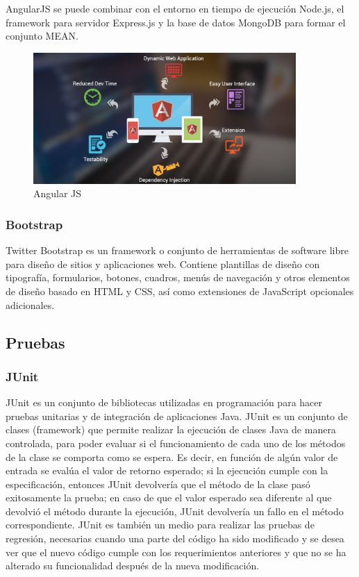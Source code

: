 \documentclass[12pt, a4paper, twoside]{book}
\begin{document}
	AngularJS se puede combinar con el entorno en tiempo de ejecución Node.js, el framework para servidor Express.js y la base de datos MongoDB para formar el conjunto MEAN.\\
	\begin{center}
		\begin{figure}[H]
			\centering
			\includegraphics[width=10cm]{Imagenes/angularjs.jpg}
			\caption{Angular JS}\label{angularjs}
		\end{figure}
	\end{center}
	\subsubsection{Bootstrap}    
	Twitter Bootstrap es un framework o conjunto de herramientas de software
	libre para diseño de sitios y aplicaciones web. Contiene plantillas de diseño con
	tipografía, formularios, botones, cuadros, menús de navegación y otros elementos
	de diseño basado en HTML y CSS, así como extensiones de JavaScript opcionales
	adicionales.  
	\subsection{Pruebas}
	\subsubsection{JUnit}
	JUnit es un conjunto de bibliotecas utilizadas en programación para hacer
	pruebas unitarias y de integración de aplicaciones Java.
	JUnit es un conjunto de clases (framework) que permite realizar la ejecución
	de clases Java de manera controlada, para poder evaluar si el funcionamiento de
	cada uno de los métodos de la clase se comporta como se espera. Es decir, en
	función de algún valor de entrada se evalúa el valor de retorno esperado; si la
	ejecución cumple con la especificación, entonces JUnit devolvería que el método
	de la clase pasó exitosamente la prueba; en caso de que el valor esperado sea
	diferente al que devolvió el método durante la ejecución, JUnit devolvería un fallo
	en el método correspondiente.
	JUnit es también un medio para realizar las pruebas de regresión, necesarias
	cuando una parte del código ha sido modificado y se desea ver que el nuevo código
	cumple con los requerimientos anteriores y que no se ha alterado su funcionalidad
	después de la nueva modificación.\cite{JUnit}
\end{document}
